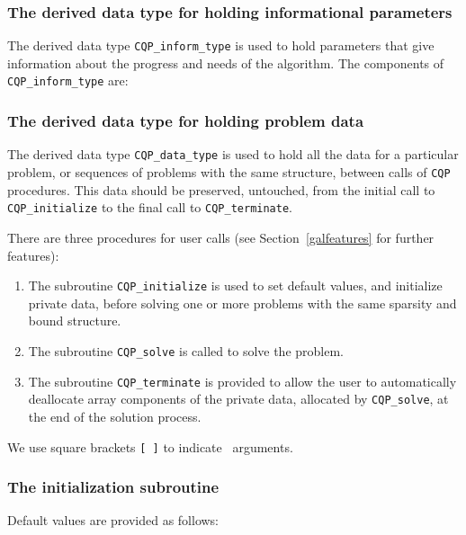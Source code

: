 \documentclass{galahad}
\newcommand{\packagename}{CQP}
\begin{document}

\subsubsection{The derived data type for holding informational
 parameters}\label{typeinform}
The derived data type
{\tt \packagename\_inform\_type}
is used to hold parameters that give information about the progress and needs
of the algorithm. The components of
{\tt \packagename\_inform\_type}
are:




\subsubsection{The derived data type for holding problem data}\label{typedata}
The derived data type
{\tt \packagename\_data\_type}
is used to hold all the data for a particular problem,
or sequences of problems with the same structure, between calls of
{\tt \packagename} procedures.
This data should be preserved, untouched, from the initial call to
{\tt \packagename\_initialize}
to the final call to
{\tt \packagename\_terminate}.


\galarguments
There are three procedures for user calls
(see Section~\ref{galfeatures} for further features):

\begin{enumerate}
\item The subroutine
      {\tt \packagename\_initialize}
      is used to set default values, and initialize private data,
      before solving one or more problems with the
      same sparsity and bound structure.
\item The subroutine
      {\tt \packagename\_solve}
      is called to solve the problem.
\item The subroutine
      {\tt \packagename\_terminate}
      is provided to allow the user to automatically deallocate array
       components of the private data, allocated by
       {\tt \packagename\_solve},
       at the end of the solution process.
\end{enumerate}
We use square brackets {\tt [ ]} to indicate \optional\ arguments.


\subsubsection{The initialization subroutine}\label{subinit}
 Default values are provided as follows:
\vspace*{1mm}
\end{document}
